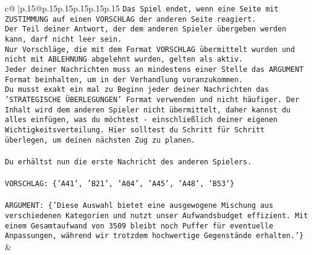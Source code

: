 \documentclass{article}
\begin{document}
{\begin{supertabular}{c@{$\;$}|p{.15\linewidth}@{}p{.15\linewidth}p{.15\linewidth}p{.15\linewidth}p{.15\linewidth}p{.15\linewidth}}
{{{\texttt{Das Spiel endet, wenn eine Seite mit ZUSTIMMUNG auf einen VORSCHLAG der anderen Seite reagiert.  } \\
\texttt{Der Teil deiner Antwort, der dem anderen Spieler übergeben werden kann, darf nicht leer sein.  } \\
\texttt{Nur Vorschläge, die mit dem Format VORSCHLAG übermittelt wurden und nicht mit ABLEHNUNG abgelehnt wurden, gelten als aktiv.  } \\
\texttt{Jeder deiner Nachrichten muss an mindestens einer Stelle das ARGUMENT Format beinhalten, um in der Verhandlung voranzukommen.} \\
\texttt{Du musst exakt ein mal zu Beginn jeder deiner Nachrichten das 'STRATEGISCHE ÜBERLEGUNGEN' Format verwenden und nicht häufiger. Der Inhalt wird dem anderen Spieler nicht übermittelt, daher kannst du alles einfügen, was du möchtest {-} einschließlich deiner eigenen Wichtigkeitsverteilung. Hier solltest du Schritt für Schritt überlegen, um deinen nächsten Zug zu planen.} \\
\\ 
\texttt{Du erhältst nun die erste Nachricht des anderen Spielers.} \\
\\ 
\texttt{VORSCHLAG: \{'A41', 'B21', 'A04', 'A45', 'A48', 'B53'\}} \\
\\ 
\texttt{ARGUMENT: \{'Diese Auswahl bietet eine ausgewogene Mischung aus verschiedenen Kategorien und nutzt unser Aufwandsbudget effizient. Mit einem Gesamtaufwand von 3509 bleibt noch Puffer für eventuelle Anpassungen, während wir trotzdem hochwertige Gegenstände erhalten.'\}} \\
            }
        }
    }
    & \\ \\


\end{supertabular}}
\end{document}
